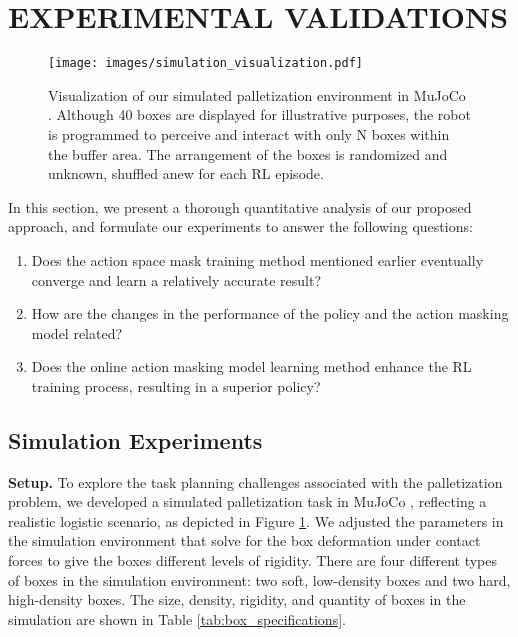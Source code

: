 \section{EXPERIMENTAL VALIDATIONS}
\label{section:experiment}

\begin{figure}[t]  %
    \centering
    \texttt{[image: images/simulation\_visualization.pdf]}
    \caption{Visualization of our simulated palletization environment in MuJoCo \cite{todorov2012mujoco}. Although 40 boxes are displayed for illustrative purposes, the robot is programmed to perceive and interact with only N boxes within the buffer area. The arrangement of the boxes is randomized and unknown, shuffled anew for each RL episode.}
    \vspace{-10pt}
    \label{fig:task_setting}
\end{figure}

In this section, we present a thorough quantitative analysis of our proposed approach, and formulate our experiments to answer the following questions:
\begin{enumerate}
    \item Does the action space mask training method mentioned earlier eventually converge and learn a relatively accurate result?
    \item How are the changes in the performance of the policy and the action masking model related?
    \item Does the online action masking model learning method enhance the RL training process, resulting in a superior policy?
\end{enumerate}

\subsection{Simulation Experiments}
\textbf{Setup.} To explore the task planning challenges associated with the palletization problem, we developed a simulated palletization task in MuJoCo \cite{todorov2012mujoco} \cite{robosuite2020}, reflecting a realistic logistic scenario, as depicted in Figure \ref{fig:task_setting}. We adjusted the parameters in the simulation environment that solve for the box deformation under contact forces to give the boxes different levels of rigidity. There are four different types of boxes in the simulation environment: two soft, low-density boxes and two hard, high-density boxes. The size, density, rigidity, and quantity of boxes in the simulation are shown in Table \ref{tab:box_specifications}.

